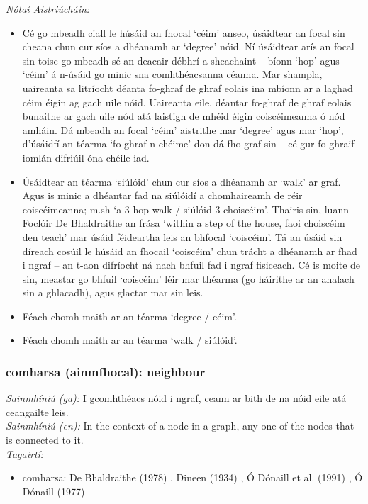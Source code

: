  \noindent \textit{Nótaí Aistriúcháin:}
\begin{itemize}
	\item Cé go mbeadh ciall le húsáid an fhocal `céim' anseo, úsáidtear an focal sin cheana chun cur síos a dhéanamh ar `degree' nóid. Ní úsáidtear arís an focal sin toisc go mbeadh sé an-deacair débhrí a sheachaint -- bíonn `hop' agus `céim' á n-úsáid go minic sna comhthéacsanna céanna. Mar shampla, uaireanta sa litríocht déanta fo-ghraf de ghraf eolais ina mbíonn ar a laghad céim éigin ag gach uile nóid. Uaireanta eile, déantar fo-ghraf de ghraf eolais bunaithe ar gach uile nód atá laistigh de mhéid éigin coiscéimeanna ó nód amháin. Dá mbeadh an focal `céim' aistrithe mar `degree' agus mar `hop', d'úsáidfí an téarma `fo-ghraf n-chéime' don dá fho-graf sin -- cé gur fo-ghraif iomlán difriúil óna chéile iad.
	\item Úsáidtear an téarma `siúlóid' chun cur síos a dhéanamh ar `walk' ar graf. Agus is minic a dhéantar fad na siúlóidí a chomhaireamh de réir coiscéimeanna; m.sh `a 3-hop walk / siúlóid 3-choiscéim'. Thairis sin, luann Foclóir De Bhaldraithe an frása `within a step of the house, faoi choiscéim den teach' mar úsáid féideartha leis an bhfocal `coiscéim'. Tá an úsáid sin díreach cosúil le húsáid an fhocail `coiscéim' chun trácht a dhéanamh ar fhad i ngraf -- an t-aon difríocht ná nach bhfuil fad i ngraf fisiceach. Cé is moite de sin, meastar go bhfuil `coiscéim' léir mar théarma (go háirithe ar an analach sin a ghlacadh), agus glactar mar sin leis.
	\item Féach chomh maith ar an téarma `degree / céim'.
	\item Féach chomh maith ar an téarma `walk / siúlóid'.
\end{itemize}


\subsubsection*{comharsa (ainmfhocal): neighbour}
 \noindent \textit{Sainmhíniú (ga):} I gcomhthéacs nóid i ngraf, ceann ar bith de na nóid eile atá ceangailte leis.
\\
 \noindent \textit{Sainmhíniú (en):} In the context of a node in a graph, any one of the nodes that is connected to it.
\\
 \noindent \textit{Tagairtí:}
\begin{itemize}
	\item comharsa: De Bhaldraithe (1978) \cite{de-bhaldraithe}, Dineen (1934) \cite{dineen}, Ó Dónaill et al. (1991) \cite{focloir-beag}, Ó Dónaill (1977) \cite{odonaill}
\end{itemize}

